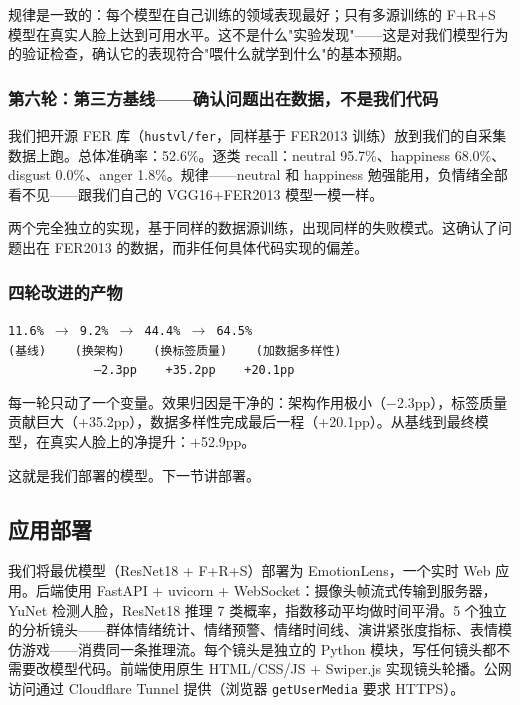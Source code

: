 \documentclass[12pt,a4paper]{ctexart}
\begin{document}
规律是一致的：每个模型在自己训练的领域表现最好；只有多源训练的 F+R+S 模型在真实人脸上达到可用水平。这不是什么"实验发现"——这是对我们模型行为的验证检查，确认它的表现符合"喂什么就学到什么"的基本预期。


\subsubsection*{第六轮：第三方基线——确认问题出在数据，不是我们代码}

我们把开源 FER 库（\texttt{hustvl/fer}，同样基于 FER2013 训练）放到我们的自采集数据上跑。总体准确率：52.6\%。逐类 recall：neutral 95.7\%、happiness 68.0\%、disgust 0.0\%、anger 1.8\%。规律——neutral 和 happiness 勉强能用，负情绪全部看不见——跟我们自己的 VGG16+FER2013 模型一模一样。

两个完全独立的实现，基于同样的数据源训练，出现同样的失败模式。这确认了问题出在 FER2013 的数据，而非任何具体代码实现的偏差。


\subsubsection*{四轮改进的产物}

\begin{center}
\texttt{11.6\% $\to$ 9.2\% $\to$ 44.4\% $\to$ 64.5\%}\\
\texttt{(基线) \ \ \ (换架构) \ \ \ (换标签质量) \ \ \ (加数据多样性)}\\
\texttt{\ \ \ \ \ \ \ \ \ \ \ \ --2.3pp \ \ \ +35.2pp \ \ \ +20.1pp}
\end{center}

每一轮只动了一个变量。效果归因是干净的：架构作用极小（$-$2.3pp），标签质量贡献巨大（+35.2pp），数据多样性完成最后一程（+20.1pp）。从基线到最终模型，在真实人脸上的净提升：+52.9pp。

这就是我们部署的模型。下一节讲部署。

\subsection{应用部署}

我们将最优模型（ResNet18 + F+R+S）部署为 EmotionLens，一个实时 Web 应用。后端使用 FastAPI + uvicorn + WebSocket：摄像头帧流式传输到服务器，YuNet 检测人脸，ResNet18 推理 7 类概率，指数移动平均做时间平滑。5 个独立的分析镜头——群体情绪统计、情绪预警、情绪时间线、演讲紧张度指标、表情模仿游戏——消费同一条推理流。每个镜头是独立的 Python 模块，写任何镜头都不需要改模型代码。前端使用原生 HTML/CSS/JS + Swiper.js 实现镜头轮播。公网访问通过 Cloudflare Tunnel 提供（浏览器 \texttt{getUserMedia} 要求 HTTPS）。
\end{document}
